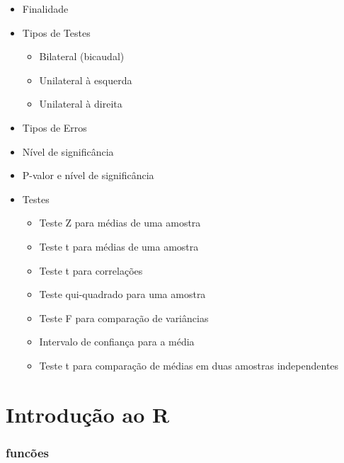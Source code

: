 \documentclass[
  letterpaper,
  DIV=11,
  numbers=noendperiod]{scrreprt}
\providecommand{\tightlist}{%
  \setlength{\itemsep}{0pt}\setlength{\parskip}{0pt}}\usepackage{longtable,booktabs,array}
\begin{document}
\begin{itemize}
\item
  Finalidade
\item
  Tipos de Testes

  \begin{itemize}
  \tightlist
  \item
    Bilateral (bicaudal)
  \item
    Unilateral à esquerda
  \item
    Unilateral à direita
  \end{itemize}
\item
  Tipos de Erros
\item
  Nível de significância
\item
  P-valor e nível de significância
\item
  Testes

  \begin{itemize}
  \item
    Teste Z para médias de uma amostra
  \item
    Teste t para médias de uma amostra
  \item
    Teste t para correlações
  \item
    Teste qui-quadrado para uma amostra
  \item
    Teste F para comparação de variâncias
  \item
    Intervalo de confiança para a média
  \item
    Teste t para comparação de médias em duas amostras independentes
  \end{itemize}
\end{itemize}

\hypertarget{introduuxe7uxe3o-ao-r}{%
\chapter{Introdução ao R}\label{introduuxe7uxe3o-ao-r}}

\hypertarget{funcuxf5es}{%
\subsection{funcões}\label{funcuxf5es}}
\end{document}
